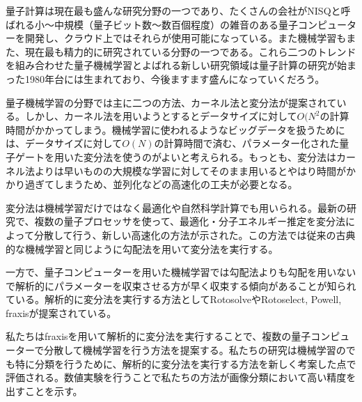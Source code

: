 \begin{jabstract}
\par 量子計算は現在最も盛んな研究分野の一つであり、たくさんの会社がNISQと呼ばれる小～中規模（量子ビット数〜数百個程度）の雑音のある量子コンピューターを開発し、クラウド上ではそれらが使用可能になっている。また機械学習もまた、現在最も精力的に研究されている分野の一つである。これら二つのトレンドを組み合わせた量子機械学習とよばれる新しい研究領域は量子計算の研究が始まった1980年台には生まれており、今後ますます盛んになっていくだろう。
\par 量子機械学習の分野では主に二つの方法、カーネル法と変分法が提案されている。しかし、カーネル法を用いようとするとデータサイズに対して$O(N^2$の計算時間がかかってしまう。機械学習に使われるようなビッグデータを扱うためには、データサイズに対して$O(N)$の計算時間で済む、パラメーター化された量子ゲートを用いた変分法を使うのがよいと考えられる。もっとも、変分法はカーネル法よりは早いものの大規模な学習に対してそのまま用いるとやはり時間がかかり過ぎてしまうため、並列化などの高速化の工夫が必要となる。
\par 変分法は機械学習だけではなく最適化や自然科学計算でも用いられる。最新の研究で、複数の量子プロセッサを使って、最適化・分子エネルギー推定を変分法によって分散して行う、新しい高速化の方法が示された。この方法では従来の古典的な機械学習と同じように勾配法を用いて変分法を実行する。
\par 一方で、量子コンピューターを用いた機械学習では勾配法よりも勾配を用いないで解析的にパラメーターを収束させる方が早く収束する傾向があることが知られている。解析的に変分法を実行する方法としてRotosolveやRotoselect, Powell,  fraxisが提案されている。
\par 私たちはfraxisを用いて解析的に変分法を実行することで、複数の量子コンピューターで分散して機械学習を行う方法を提案する。私たちの研究は機械学習のでも特に分類を行うために、解析的に変分法を実行する方法を新しく考案した点で評価される。数値実験を行うことで私たちの方法が画像分類において高い精度を出すことを示す。
\end{jabstract}